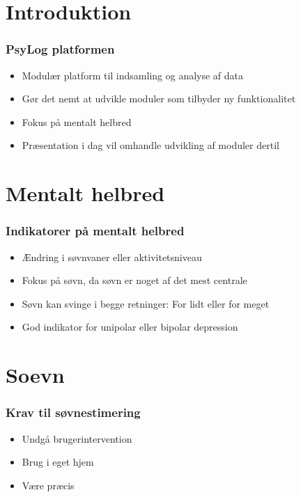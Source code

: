 \section{Introduktion}
\begin{frame}
\frametitle{PsyLog platformen}
	\begin{itemize}
	\item Modulær platform til indsamling og analyse af data
	\item Gør det nemt at udvikle moduler som tilbyder ny funktionalitet
	\item Fokus på mentalt helbred
	\item Præsentation i dag vil omhandle udvikling af moduler dertil
	\end{itemize}
\end{frame}

\section{Mentalt helbred}
\begin{frame}
\frametitle{Indikatorer på mentalt helbred}
	\begin{itemize}
	\item Ændring i søvnvaner eller aktivitetsniveau
	\item Fokus på søvn, da søvn er noget af det mest centrale
	\item Søvn kan svinge i begge retninger: For lidt eller for meget
	\item God indikator for unipolar eller bipolar depression
	\end{itemize}
\end{frame}

\section{Soevn}
\begin{frame}
\frametitle{Krav til søvnestimering}
	\begin{itemize}
	\item Undgå brugerintervention
	\item Brug i eget hjem
	\item Være præcis
	\end{itemize}
\end{frame}

